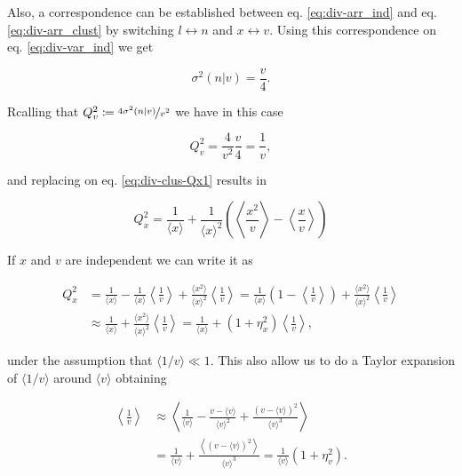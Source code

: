 Also, a correspondence can be established between eq. \eqref{eq:div-arr_ind} and eq. \eqref{eq:div-arr_clust} by switching $l\leftrightarrow n$ and $x\leftrightarrow v$. Using this correspondence on eq. \eqref{eq:div-var_ind} we get 

\begin{equation}
  \sigma^2(n|v) = \frac{v}{4}.
\end{equation}

Rcalling that $Q_v^2 \coloneqq \nicefrac{4\sigma^2(n|v)}{v^2}$ we have in this case

\begin{equation}
  Q_v^2 = \frac{4}{v^2}\frac{v}{4} = \frac{1}{v},
\end{equation}

and replacing on eq. \eqref{eq:div-clus-Qx1} results in

\begin{equation}
  \label{eq:div-clus-Qx2}
  \boxed{Q_x^2 = \frac{1}{\langle x\rangle} + \frac{1}{\langle x\rangle^2}\left(\left\langle \frac{x^2}{v}\right\rangle-\left\langle \frac{x}{v}\right\rangle \right)}
\end{equation}


If $x$ and $v$ are independent we can write it as

\begin{equation*}
  \begin{split}
    Q_x^2 &= \frac{1}{\langle x\rangle} - \frac{1}{\langle x\rangle}\left\langle\frac{1}{v}\right\rangle + \frac{\langle x^2\rangle}{\langle x\rangle^2}\left\langle\frac{1}{v}\right\rangle = \frac{1}{\langle x\rangle}\left(1-\left\langle\frac{1}{v}\right\rangle\right)+\frac{\langle x^2\rangle}{\langle x\rangle^2}\left\langle\frac{1}{v}\right\rangle\\
  &\approx \frac{1}{\langle x\rangle} + \frac{\langle x^2\rangle}{\langle x\rangle^2}\left\langle\frac{1}{v}\right\rangle = \frac{1}{\langle x\rangle} + \left(1+\eta_x^2\right)\left\langle\frac{1}{v}\right\rangle,
  \end{split}
\end{equation*}

under the assumption that $\langle 1/v\rangle \ll 1$. This also allow us to do a Taylor expansion of $\langle 1/v\rangle$ around $\langle v\rangle$ obtaining

\begin{equation*}
  \begin{split}
    \left\langle\frac{1}{v}\right\rangle &\approx \left\langle \frac{1}{\langle v\rangle} - \frac{v-\langle v\rangle}{\langle v\rangle^2} + \frac{(v-\langle v\rangle)^2}{\langle v\rangle^3}\right\rangle\\
    &=\frac{1}{\langle v\rangle} + \frac{\left\langle(v-\langle v\rangle)^2\right\rangle}{\langle v\rangle^3} = \frac{1}{\langle v\rangle}\left(1+\eta_v^2\right).
  \end{split}
\end{equation*}

